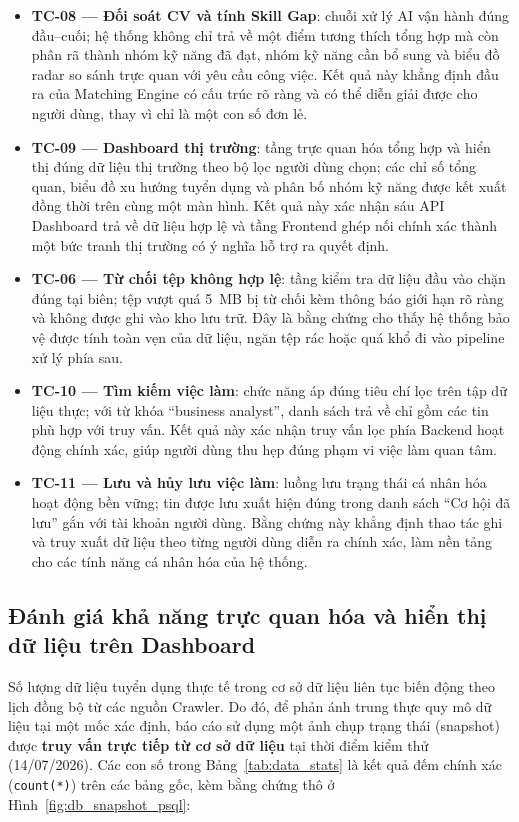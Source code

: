\begin{itemize}
    \item \textbf{TC-08 --- Đối soát CV và tính Skill Gap}: chuỗi xử lý AI vận hành đúng đầu--cuối; hệ thống không chỉ trả về một điểm tương thích tổng hợp mà còn phân rã thành nhóm kỹ năng đã đạt, nhóm kỹ năng cần bổ sung và biểu đồ radar so sánh trực quan với yêu cầu công việc. Kết quả này khẳng định đầu ra của Matching Engine có cấu trúc rõ ràng và có thể diễn giải được cho người dùng, thay vì chỉ là một con số đơn lẻ.
    \item \textbf{TC-09 --- Dashboard thị trường}: tầng trực quan hóa tổng hợp và hiển thị đúng dữ liệu thị trường theo bộ lọc người dùng chọn; các chỉ số tổng quan, biểu đồ xu hướng tuyển dụng và phân bố nhóm kỹ năng được kết xuất đồng thời trên cùng một màn hình. Kết quả này xác nhận sáu API Dashboard trả về dữ liệu hợp lệ và tầng Frontend ghép nối chính xác thành một bức tranh thị trường có ý nghĩa hỗ trợ ra quyết định.
    \item \textbf{TC-06 --- Từ chối tệp không hợp lệ}: tầng kiểm tra dữ liệu đầu vào chặn đúng tại biên; tệp vượt quá 5~MB bị từ chối kèm thông báo giới hạn rõ ràng và không được ghi vào kho lưu trữ. Đây là bằng chứng cho thấy hệ thống bảo vệ được tính toàn vẹn của dữ liệu, ngăn tệp rác hoặc quá khổ đi vào pipeline xử lý phía sau.
    \item \textbf{TC-10 --- Tìm kiếm việc làm}: chức năng áp đúng tiêu chí lọc trên tập dữ liệu thực; với từ khóa ``business analyst'', danh sách trả về chỉ gồm các tin phù hợp với truy vấn. Kết quả này xác nhận truy vấn lọc phía Backend hoạt động chính xác, giúp người dùng thu hẹp đúng phạm vi việc làm quan tâm.
    \item \textbf{TC-11 --- Lưu và hủy lưu việc làm}: luồng lưu trạng thái cá nhân hóa hoạt động bền vững; tin được lưu xuất hiện đúng trong danh sách ``Cơ hội đã lưu'' gắn với tài khoản người dùng. Bằng chứng này khẳng định thao tác ghi và truy xuất dữ liệu theo từng người dùng diễn ra chính xác, làm nền tảng cho các tính năng cá nhân hóa của hệ thống.
\end{itemize}

\subsection{Đánh giá khả năng trực quan hóa và hiển thị dữ liệu trên Dashboard}

Số lượng dữ liệu tuyển dụng thực tế trong cơ sở dữ liệu liên tục biến động theo lịch đồng bộ từ các nguồn Crawler. Do đó, để phản ánh trung thực quy mô dữ liệu tại một mốc xác định, báo cáo sử dụng một ảnh chụp trạng thái (snapshot) được \textbf{truy vấn trực tiếp từ cơ sở dữ liệu} tại thời điểm kiểm thử (14/07/2026). Các con số trong Bảng~\ref{tab:data_stats} là kết quả đếm chính xác (\texttt{count(*)}) trên các bảng gốc, kèm bằng chứng thô ở Hình~\ref{fig:db_snapshot_psql}:

